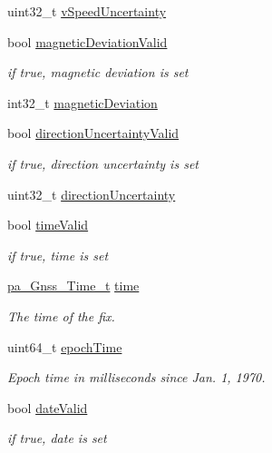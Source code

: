 \begin{DoxyCompactItemize}
uint32\+\_\+t \hyperlink{structpa___gnss___position__t_ab1d29a0add539d38bfa028a91da203b4}{v\+Speed\+Uncertainty}
\item 
bool \hyperlink{structpa___gnss___position__t_a43847779aa9bad04445b02ec7d40380e}{magnetic\+Deviation\+Valid}
\begin{DoxyCompactList}\small\item\em if true, magnetic deviation is set \end{DoxyCompactList}\item 
int32\+\_\+t \hyperlink{structpa___gnss___position__t_ae7e64db034ccdae6989aa690153b5cea}{magnetic\+Deviation}
\item 
bool \hyperlink{structpa___gnss___position__t_a3cf3e00ef65eee1aeb1dc8f266691259}{direction\+Uncertainty\+Valid}
\begin{DoxyCompactList}\small\item\em if true, direction uncertainty is set \end{DoxyCompactList}\item 
uint32\+\_\+t \hyperlink{structpa___gnss___position__t_a3fd8bbfc2158b8daf226785248c31f70}{direction\+Uncertainty}
\item 
bool \hyperlink{structpa___gnss___position__t_a0707a2b4e8cf2148086098e7a3fa1b9f}{time\+Valid}
\begin{DoxyCompactList}\small\item\em if true, time is set \end{DoxyCompactList}\item 
\hyperlink{structpa___gnss___time__t}{pa\+\_\+\+Gnss\+\_\+\+Time\+\_\+t} \hyperlink{structpa___gnss___position__t_ab256ec83be6d9467259e570862ef93a3}{time}
\begin{DoxyCompactList}\small\item\em The time of the fix. \end{DoxyCompactList}\item 
uint64\+\_\+t \hyperlink{structpa___gnss___position__t_a0c373651bd68eeabed00bbb1b6599f48}{epoch\+Time}
\begin{DoxyCompactList}\small\item\em Epoch time in milliseconds since Jan. 1, 1970. \end{DoxyCompactList}\item 
bool \hyperlink{structpa___gnss___position__t_ab6005a21c11884b9f509f3582610ddc8}{date\+Valid}
\begin{DoxyCompactList}\small\item\em if true, date is set \end{DoxyCompactList}\item 

\end{DoxyCompactItemize}
